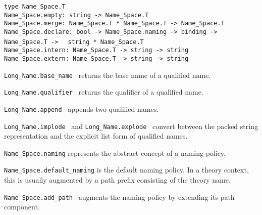 \begin{isabellebody}
\begin{isamarkuptext}
\begin{mldecls}
  \end{mldecls}
  \begin{mldecls}
  \verb|type Name_Space.T| \\
  \verb|Name_Space.empty: string -> Name_Space.T| \\
  \verb|Name_Space.merge: Name_Space.T * Name_Space.T -> Name_Space.T| \\
  \verb|Name_Space.declare: bool -> Name_Space.naming -> binding -> Name_Space.T ->|\isasep\isanewline%
\verb|  string * Name_Space.T| \\
  \verb|Name_Space.intern: Name_Space.T -> string -> string| \\
  \verb|Name_Space.extern: Name_Space.T -> string -> string| \\
  \end{mldecls}

  \begin{description}

  \item \verb|Long_Name.base_name|~ returns the base name of a
  qualified name.

  \item \verb|Long_Name.qualifier|~ returns the qualifier
  of a qualified name.

  \item \verb|Long_Name.append|~
  appends two qualified names.

  \item \verb|Long_Name.implode|~ and \verb|Long_Name.explode|~ convert between the packed string
  representation and the explicit list form of qualified names.

  \item \verb|Name_Space.naming| represents the abstract concept of
  a naming policy.

  \item \verb|Name_Space.default_naming| is the default naming policy.
  In a theory context, this is usually augmented by a path prefix
  consisting of the theory name.

  \item \verb|Name_Space.add_path|~ augments the
  naming policy by extending its path component.


\end{description}
\end{isamarkuptext}
\end{isabellebody}
